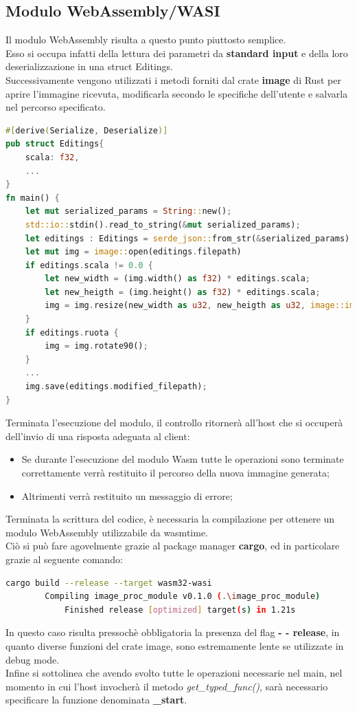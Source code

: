 \subsection{Modulo WebAssembly/WASI}
Il modulo WebAssembly risulta a questo punto piuttosto semplice.
\\Esso si occupa infatti della lettura dei parametri da \textbf{standard input} e della loro deserializzazione in una struct Editings.
\\Successivamente vengono utilizzati i metodi forniti dal crate \textbf{image} di Rust per aprire l'immagine ricevuta, modificarla secondo le specifiche dell'utente e salvarla nel percorso specificato.\cite{rust:image}

\begin{lstlisting}[language=rust, caption={Codice Rust che successivamente verrà compilato in WebAssembly}, showstringspaces=false]
#[derive(Serialize, Deserialize)]
pub struct Editings{
    scala: f32,
    ...
}
fn main() {
    let mut serialized_params = String::new();
    std::io::stdin().read_to_string(&mut serialized_params);
    let editings : Editings = serde_json::from_str(&serialized_params);
    let mut img = image::open(editings.filepath)
    if editings.scala != 0.0 {
        let new_width = (img.width() as f32) * editings.scala;
        let new_heigth = (img.height() as f32) * editings.scala;
        img = img.resize(new_width as u32, new_heigth as u32, image::imageops::FilterType::Nearest);
    }
    if editings.ruota {
        img = img.rotate90();
    }
    ...
    img.save(editings.modified_filepath);
}
\end{lstlisting}
Terminata l'esecuzione del modulo, il controllo ritornerà all'host che si occuperà dell'invio di una risposta adeguata al client:
\begin{itemize}
    \item Se durante l'esecuzione del modulo Wasm tutte le operazioni sono terminate correttamente verrà restituito il percorso della nuova immagine generata;
    \item Altrimenti verrà restituito un messaggio di errore;
\end{itemize}
Terminata la scrittura del codice, è necessaria la compilazione per ottenere un modulo WebAssembly utilizzabile da wasmtime.
\\Ciò si può fare agovelmente grazie al package manager \textbf{cargo}, ed in particolare grazie al seguente comando:
\begin{lstlisting}[language=Bash, numbers=none]
cargo build --release --target wasm32-wasi
        Compiling image_proc_module v0.1.0 (.\image_proc_module)
            Finished release [optimized] target(s) in 1.21s
\end{lstlisting}
In questo caso risulta pressochè obbligatoria la presenza del flag \textbf{- - release}, in quanto diverse funzioni del crate image, sono estremamente lente se utilizzate in debug mode.
\\Infine si sottolinea che avendo svolto tutte le operazioni necessarie nel main, nel momento in cui l'host invocherà il metodo \emph{get\_typed\_func()}, sarà necessario specificare la funzione denominata \textbf{\_start}.



